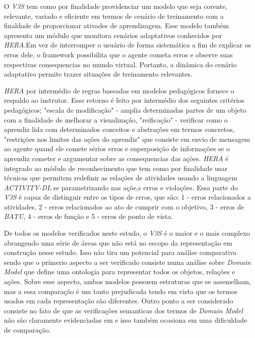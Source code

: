 O \textit{V3S} tem como por finalidade providenciar um modelo que seja corente, relevante, variado e eficiente em termos de cenário de treinamento com a finaldade de proporcionar ativades de aprendizagem. Esse modelo também apresenta um módulo 
que monitora cenários adaptativos conhecidos por \textit{HERA}.Em vez de interromper o usuário de forma sistemática a fim de explicar os erros dele, o framework possibilita que o agente cometa erros e observe suas respectivas consequencias 
no mundo virtual. Portanto, a dinâmica do cenário adaptativo permite trazer situações de treinamento relevantes. 

\textit{HERA} por intermédio de regras baseadas em modelos pedagógicos fornece o respaldo ao instrutor. Esse retorno é feito por intermédio dos seguintes critérios pedagógicos; "escala de modificação" - amplia determinadas partes de um objeto 
com a finalidade de melhorar a visualização, "reificação" - verificar como o aprendiz lida com determinados conceitos e abstrações em termos concretos, "restrições nos limites das ações do aprendiz" que consiste em envio de mensagem ao agente 
quand ele comete sérios erros e superposição de informações se o aprendiz cometer e argumentar sobre as consequencias das ações. \textit{HERA} é integrado ao módulo de reconhecimento que tem como por finalidade usar técnicas que permitem 
redefinir as relações de atividades usando a linguagem \textit{ACTIVITY-DL} se parametrizando nas açõe,s erros e violações. Essa parte do \textit{V3S} é capaz de distinguir entre os tipos de erros, que são: 1 - erros relacionados a atividades,
2 - erros relacionados ao ato de cumprir com o objetivo, 3 - erros de \textit{BATU}, 4 - erros de função e 5 - erros de ponto de vista.

De todos os modelos verificados neste estudo, o \textit{V3S} é o maior e o mais complexo abrangendo uma série de áreas que não está no escopo da representação em construção nesse estudo. Isso não tira um potencial para análise comparativa sendo que o primerio aspecto a ser verificado consiste numa análise sobre \textit{Domain Model} que define uma ontologia para representar todos os objetos, relações e ações. Sobre esse aspecto, ambos modelos possuem estruturas que se assemelham, mas a essa comparação é um tanto prejudicada tendo em vista que os termos usados em cada representação são diferentes. Outro ponto a ser considerado consiste no fato de que as verificações semanticas dos termos de \textit{Domain Model} não são claramente 
evidenciadas em \cite{v3sframework} e isso também ocasiona em uma dificuldade de comparação. 

